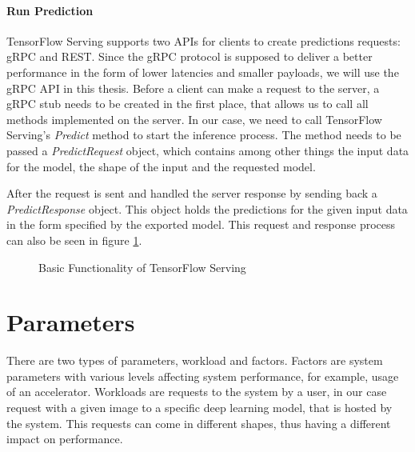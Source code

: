 \paragraph{Run Prediction}
TensorFlow Serving supports two APIs for clients to create predictions requests: gRPC and REST. Since the gRPC protocol is supposed to deliver a better performance in the form of lower latencies and smaller payloads, we will use the gRPC API in this thesis.
Before a client can make a request to the server, a gRPC stub needs to be created in the first place, that allows us to call all methods implemented on the server. In our case, we need to call TensorFlow Serving's \emph{Predict} method to start the inference process. The method needs to be passed a \emph{PredictRequest} object, which contains among other things the input data for the model, the shape of the input and the requested model.%

After the request is sent and handled the server response by sending back a \emph{PredictResponse} object. This object holds the predictions for the given input data in the form specified by the exported model.
This request and response process can also be seen in figure \ref{fig:cloud}.

\begin{figure}[!htb]
\centering

\caption{Basic Functionality of TensorFlow Serving}
\label{fig:cloud}
\end{figure}
 




\section{Parameters}
\label{chap:parameters}
There are two types of parameters, workload and factors.
Factors are system parameters with various levels affecting system performance, for example, usage of an accelerator.
Workloads are requests to the system by a user, in our case request with a given image to a specific deep learning model, that is hosted by the system.
This requests can come in different shapes, thus having a different impact
on performance.
